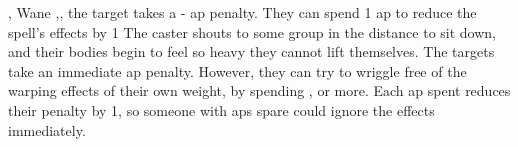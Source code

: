   {\mEarth,\mFire}%
  {Wane}%
  {\detailed,\distant,\duplicated}%
  {}%
  {the target takes a - \gls{ap} penalty. They can spend 1 \gls{ap} to reduce the spell's effects by 1}%
  {
    The caster shouts to some group in the distance to sit down, and their bodies begin to feel so heavy they cannot lift themselves.
    The targets take an immediate  \gls{ap} penalty.
    However, they can try to wriggle free of the warping effects of their own weight, by spending , or more.
    Each \gls{ap} spent reduces their penalty by 1, so someone with  \glspl{ap} spare could ignore the effects immediately.
  }

